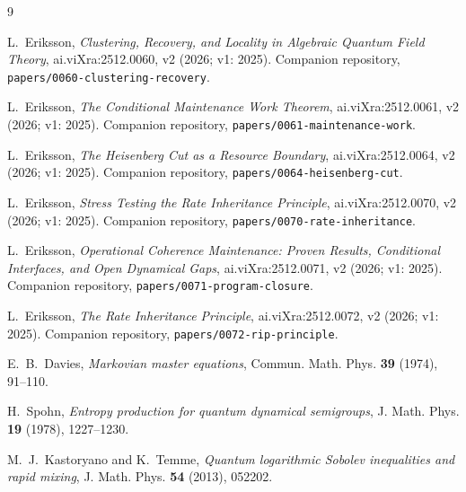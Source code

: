 \documentclass[11pt,a4paper]{article}
\theoremstyle{plain}
\theoremstyle{definition}
\theoremstyle{remark}
\begin{document}
\begin{thebibliography}{9}\small

 L.~Eriksson, \emph{Clustering, Recovery, and Locality in
Algebraic Quantum Field Theory}, ai.viXra:2512.0060, v2 (2026; v1: 2025).
Companion repository, \texttt{papers/0060-clustering-recovery}.

 L.~Eriksson, \emph{The Conditional Maintenance Work
Theorem}, ai.viXra:2512.0061, v2 (2026; v1: 2025). Companion repository,
\texttt{papers/0061-maintenance-work}.

 L.~Eriksson, \emph{The Heisenberg Cut as a Resource Boundary},
ai.viXra:2512.0064, v2 (2026; v1: 2025). Companion repository,
\texttt{papers/0064-heisenberg-cut}.

 L.~Eriksson, \emph{Stress Testing the Rate Inheritance
Principle}, ai.viXra:2512.0070, v2 (2026; v1: 2025). Companion repository,
\texttt{papers/0070-rate-inheritance}.

 L.~Eriksson, \emph{Operational Coherence Maintenance:
Proven Results, Conditional Interfaces, and Open Dynamical Gaps},
ai.viXra:2512.0071, v2 (2026; v1: 2025). Companion repository,
\texttt{papers/0071-program-closure}.

 L.~Eriksson, \emph{The Rate Inheritance Principle},
ai.viXra:2512.0072, v2 (2026; v1: 2025). Companion repository,
\texttt{papers/0072-rip-principle}.

 E.~B.~Davies, \emph{Markovian master equations}, Commun.
Math. Phys. \textbf{39} (1974), 91--110.

 H.~Spohn, \emph{Entropy production for quantum dynamical
semigroups}, J. Math. Phys. \textbf{19} (1978), 1227--1230.

 M.~J.~Kastoryano and K.~Temme, \emph{Quantum
logarithmic Sobolev inequalities and rapid mixing}, J. Math. Phys.
\textbf{54} (2013), 052202.

\end{thebibliography}
\end{document}
